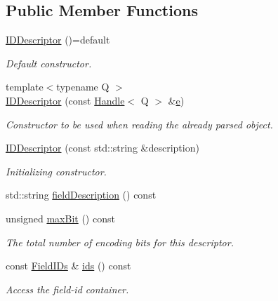 \subsection*{Public Member Functions}
\begin{DoxyCompactItemize}
\item 
\hyperlink{class_d_d4hep_1_1_geometry_1_1_i_d_descriptor_a967c8ac32de2bb90e1f94ecabe20828f}{I\+D\+Descriptor} ()=default
\begin{DoxyCompactList}\small\item\em Default constructor. \end{DoxyCompactList}\item 
{\footnotesize template$<$typename Q $>$ }\\\hyperlink{class_d_d4hep_1_1_geometry_1_1_i_d_descriptor_aaa327c8a2e0ed097034624c1cb2e3f8c}{I\+D\+Descriptor} (const \hyperlink{class_d_d4hep_1_1_handle}{Handle}$<$ Q $>$ \&\hyperlink{_volumes_8cpp_a8a9a1f93e9b09afccaec215310e64142}{e})
\begin{DoxyCompactList}\small\item\em Constructor to be used when reading the already parsed object. \end{DoxyCompactList}\item 
\hyperlink{class_d_d4hep_1_1_geometry_1_1_i_d_descriptor_a581b17106d07d9a8baec51c6e99cc1dd}{I\+D\+Descriptor} (const std\+::string \&description)
\begin{DoxyCompactList}\small\item\em Initializing constructor. \end{DoxyCompactList}\item 
std\+::string \hyperlink{class_d_d4hep_1_1_geometry_1_1_i_d_descriptor_a5bbbe15fcfb1921bf0cd687e8aa03fb0}{field\+Description} () const
\item 
unsigned \hyperlink{class_d_d4hep_1_1_geometry_1_1_i_d_descriptor_a18aca33980ee8741f1d7d3285d8db25f}{max\+Bit} () const
\begin{DoxyCompactList}\small\item\em The total number of encoding bits for this descriptor. \end{DoxyCompactList}\item 
const \hyperlink{class_d_d4hep_1_1_geometry_1_1_i_d_descriptor_a0ced4a2fe6dd5775becad359f39a9ee2}{Field\+I\+Ds} \& \hyperlink{class_d_d4hep_1_1_geometry_1_1_i_d_descriptor_a077a567e44dc8200d05e6eae30c42870}{ids} () const
\begin{DoxyCompactList}\small\item\em Access the field-\/id container. \end{DoxyCompactList}\item 

\end{DoxyCompactItemize}
